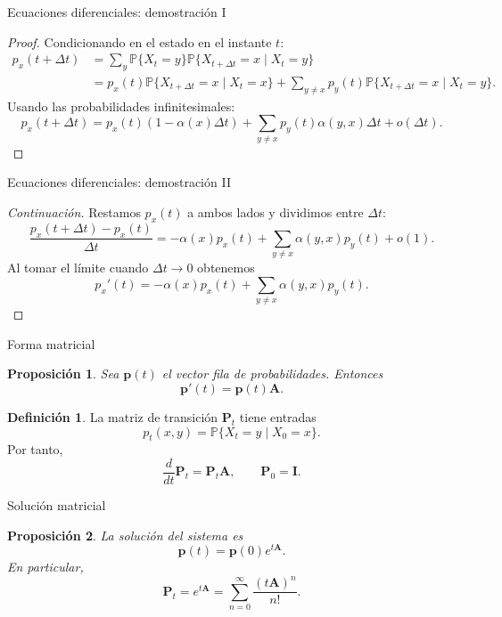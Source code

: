 \documentclass[aspectratio=169]{beamer}
\theoremstyle{plain}
\newtheorem{proposicion}{Proposición}
\theoremstyle{definition}
\newtheorem{definicion}{Definición}
\newcommand{\A}{\mathbf{A}}
\newcommand{\I}{\mathbf{I}}
\newcommand{\PP}{\mathbf{P}}
\newcommand{\p}{\mathbf{p}}
\newcommand{\Prob}{\mathbb{P}}
\newcommand{\1}{\mathbf{1}}
\begin{document}
\begin{frame}{Ecuaciones diferenciales: demostración I}
  \begin{proof}
    Condicionando en el estado en el instante $t$:
    \begin{align*}
      p_x(t+\Delta t)
      &= \sum_y \Prob\{X_t=y\}\Prob\{X_{t+\Delta t}=x\mid X_t=y\} \\
      &= p_x(t)\Prob\{X_{t+\Delta t}=x\mid X_t=x\}
         + \sum_{y\neq x} p_y(t)\Prob\{X_{t+\Delta t}=x\mid X_t=y\}.
    \end{align*}
    Usando las probabilidades infinitesimales:
    \[
      p_x(t+\Delta t)
      = p_x(t)(1-\alpha(x)\Delta t)
      + \sum_{y\neq x} p_y(t)\alpha(y,x)\Delta t
      + o(\Delta t).
    \]
  \end{proof}
\end{frame}

\begin{frame}{Ecuaciones diferenciales: demostración II}
  \begin{proof}[Continuación]
    Restamos $p_x(t)$ a ambos lados y dividimos entre $\Delta t$:
    \[
      \frac{p_x(t+\Delta t)-p_x(t)}{\Delta t}
      = -\alpha(x)p_x(t) + \sum_{y\neq x}\alpha(y,x)p_y(t) + o(1).
    \]
    Al tomar el límite cuando $\Delta t\to 0$ obtenemos
    \[
      p_x'(t) = -\alpha(x)p_x(t) + \sum_{y\neq x} \alpha(y,x)p_y(t).
    \]
  \end{proof}
\end{frame}

\begin{frame}{Forma matricial}
  \begin{proposicion}
    Sea $\p(t)$ el vector fila de probabilidades. Entonces
    \[
      \p'(t) = \p(t)\A.
    \]
  \end{proposicion}

  \begin{definicion}
    La matriz de transición $\PP_t$ tiene entradas
    \[
      p_t(x,y) = \Prob\{X_t = y \mid X_0 = x\}.
    \]
    Por tanto,
    \[
      \frac{d}{dt}\PP_t = \PP_t\A,
      \qquad
      \PP_0 = \I.
    \]
  \end{definicion}
\end{frame}

\begin{frame}{Solución matricial}
  \begin{proposicion}
    La solución del sistema es
    \[
      \p(t) = \p(0)e^{t\A}.
    \]
    En particular,
    \[
      \PP_t = e^{t\A}
      = \sum_{n=0}^{\infty} \frac{(t\A)^n}{n!}.
    \]
  \end{proposicion}

  \vspace{0.25cm}
  \begin{center}
  \end{center}
\end{frame}
\end{document}
